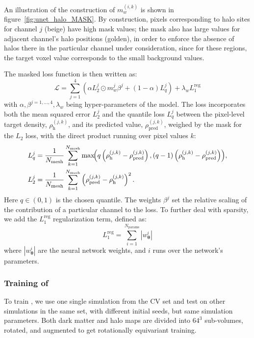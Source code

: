 An illustration of the construction of $m_w^{(i,k)}$ is shown in figure~\ref{fig:unet_halo_MASK}. By construction, pixels corresponding to halo sites for channel $j$ (beige) have high mask values; the mask also has large values for adjacent channel's halo positions (golden), in order to enforce the absence of halos there in the particular channel under consideration, since  for these regions, the target voxel value corresponds to the small background values.


The masked loss function is then written as:
\begin{equation} \label{eqn:lossfn}
    \mathcal{L} = \displaystyle\sum_{j=1}^4 \left(\alpha L_2^j\odot m_w^j\beta^j + \left(1-\alpha \right)L^j_q
     \right) + \lambda_w L_1^{\text{reg}}
\end{equation}
with $\alpha,\beta^{j=1, \dots, 4},\lambda_w$ being hyper-parameters of the model. The loss incorporates both the mean squared error $L_2^j$ and the quantile loss $L_q^j$  between the pixel-level target density, $\rho_{\text{h}}^{(j,k)}$, and its predicted value, $\rho_{\text{pred}}^{(j,k)}$, weighed by the mask for the $L_2$ loss, with the direct product running over pixel values $k$:
\begin{equation}
\begin{split}
L_{q}^{j} &=
  \frac{1}{N_\text{mesh}}\sum_{k=1}^{N_\text{mesh}}
  \max\!\Bigl(
      q\left(\rho_{\text{h}}^{(j,k)}-\rho_{\text{pred}}^{(j,k)}\right),
      (q-1)\left(\rho_{\text{h}}^{(j,k)}-\rho_{\text{pred}}^{(j,k)}\right)
  \Bigr),\\
L_{2}^j &=
  \frac{1}{N_\text{mesh}}\sum_{k=1}^{N_\text{mesh}}
  \left(\rho_{\text{pred}}^{(j,k)}-\rho_{\text{h}}^{(j,k)}\right)^{2}.
\end{split}
\end{equation}
Here $q \in (0, 1)$ is the chosen quantile.
The weights $\beta^j$ set the relative scaling of the contribution of a particular channel to the loss.
To further deal with sparsity, we add the $L_1^{\text{reg}}$ regularization term, defined as:
\begin{equation}
    L_1^{\text{reg}} = \sum_{i=1}^{N_\text{params}} \left| w^i_{\boldsymbol{\theta}} \right|
\end{equation}
where $\left| w^i_{\boldsymbol{\theta}} \right|$ are the neural network weights, and $i$ runs over the network's parameters.
\vspace{\baselineskip}




\subsubsection{Training of \HALOgen}
To train \HALOgen, we use one single simulation from the CV set and test on other simulations in the same set, with different initial seeds, but same simulation parameters. Both dark matter and halo maps are divided into $64^3$ sub-volumes, rotated, and augmented to get rotationally equivariant training.

